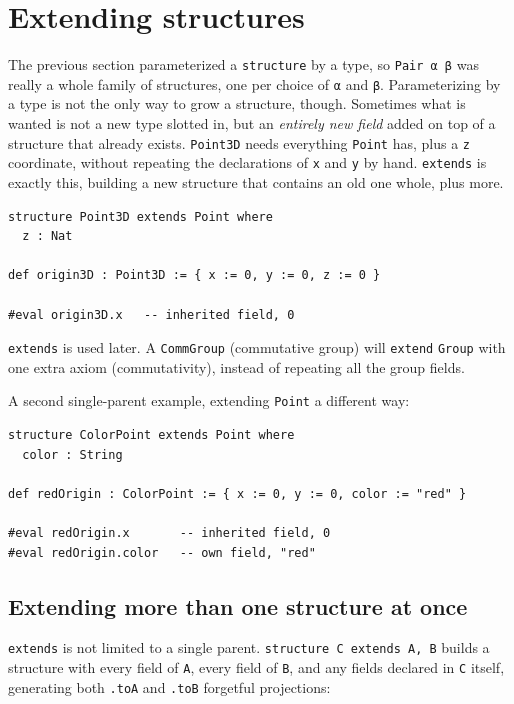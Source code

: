 \section{Extending structures}\label{sec:02-functions-and-structures:03-extending-structures:1}

The previous section parameterized a \texttt{structure} by a type, so \texttt{Pair α β} was really a whole family of structures, one per choice of \texttt{α} and \texttt{β}. Parameterizing by a type is not the only way to grow a structure, though. Sometimes what is wanted is not a new type slotted in, but an \emph{entirely new field} added on top of a structure that already exists. \texttt{Point3D} needs everything \texttt{Point} has, plus a \texttt{z} coordinate, without repeating the declarations of \texttt{x} and \texttt{y} by hand. \texttt{extends} is exactly this, building a new structure that contains an old one whole, plus more.

\begin{lstlisting}
structure Point3D extends Point where
  z : Nat

def origin3D : Point3D := { x := 0, y := 0, z := 0 }

#eval origin3D.x   -- inherited field, 0
\end{lstlisting}

\texttt{extends} is used later. A \texttt{CommGroup} (commutative group) will \texttt{extend} \texttt{Group} with one extra axiom (commutativity), instead of repeating all the group fields.

A second single-parent example, extending \texttt{Point} a different way:

\begin{lstlisting}
structure ColorPoint extends Point where
  color : String

def redOrigin : ColorPoint := { x := 0, y := 0, color := "red" }

#eval redOrigin.x       -- inherited field, 0
#eval redOrigin.color   -- own field, "red"
\end{lstlisting}

\subsection{Extending more than one structure at once}\label{sec:02-functions-and-structures:03-extending-structures:2}

\texttt{extends} is not limited to a single parent. \texttt{structure C extends A, B} builds a structure with every field of \texttt{A}, every field of \texttt{B}, and any fields declared in \texttt{C} itself, generating both \texttt{.toA} and \texttt{.toB} forgetful projections:


